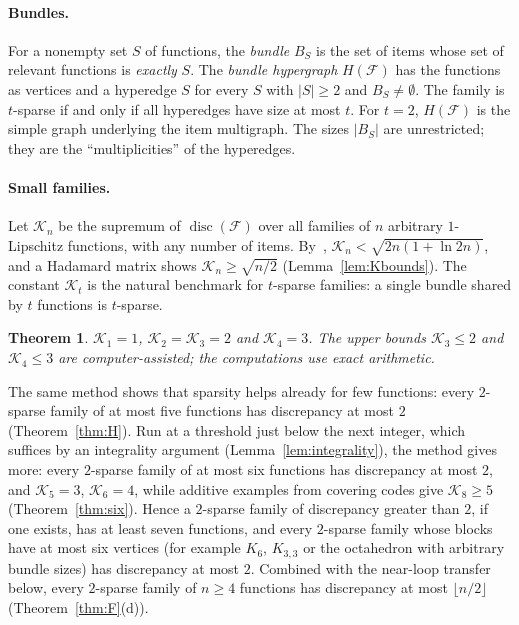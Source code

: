 \documentclass[11pt,letterpaper]{article}
\newtheorem{theorem}{Theorem}[section]
\theoremstyle{definition}
\newcommand{\cF}{\mathcal{F}}
\DeclareMathOperator{\disc}{disc}
\begin{document}
\paragraph{Bundles.}
For a nonempty set $S$ of functions, the \emph{bundle} $B_S$ is the set of items whose set of
relevant functions is \emph{exactly} $S$. The \emph{bundle hypergraph} $H(\cF)$ has the functions
as vertices and a hyperedge $S$ for every $S$ with $|S|\ge2$ and $B_S\ne\emptyset$. The family is
$t$-sparse if and only if all hyperedges have size at most $t$. For $t=2$, $H(\cF)$ is the simple
graph underlying the item multigraph. The sizes $|B_S|$ are unrestricted; they are the
``multiplicities'' of the hyperedges.

\paragraph{Small families.}
Let $\mathcal{K}_n$ be the supremum of $\disc(\cF)$ over all families of $n$ arbitrary $1$-Lipschitz
functions, with any number of items. By~\cite[Theorem~8]{HMMS25}, $\mathcal{K}_n<\sqrt{2n(1+\ln 2n)}$, and
a Hadamard matrix shows $\mathcal{K}_n\ge\sqrt{n/2}$ (Lemma~\ref{lem:Kbounds}). The constant $\mathcal{K}_t$ is the
natural benchmark for $t$-sparse families: a single bundle shared by $t$ functions is $t$-sparse.

\begin{theorem}\label{thm:Kn}
$\mathcal{K}_1=1$, $\mathcal{K}_2=\mathcal{K}_3=2$ and $\mathcal{K}_4=3$. The upper bounds $\mathcal{K}_3\le2$ and $\mathcal{K}_4\le3$ are
computer-assisted; the computations use exact arithmetic.
\end{theorem}

The same method shows that sparsity helps already for few functions: every $2$-sparse family of at
most five functions has discrepancy at most $2$ (Theorem~\ref{thm:H}). Run at a threshold just below
the next integer, which suffices by an integrality argument (Lemma~\ref{lem:integrality}), the method
gives more: every $2$-sparse family of at most six functions has discrepancy at most $2$, and
$\mathcal{K}_5=3$, $\mathcal{K}_6=4$, while additive examples from covering codes give $\mathcal{K}_8\ge5$
(Theorem~\ref{thm:six}). Hence a $2$-sparse family of discrepancy greater than $2$, if one exists, has
at least seven functions, and every $2$-sparse family whose blocks have at most six vertices (for
example $K_6$, $K_{3,3}$ or the octahedron with arbitrary bundle sizes) has discrepancy at most $2$. Combined with the near-loop transfer below, every
$2$-sparse family of $n\ge4$ functions has discrepancy at most $\lfloor n/2\rfloor$
(Theorem~\ref{thm:F}(d)).
\end{document}
